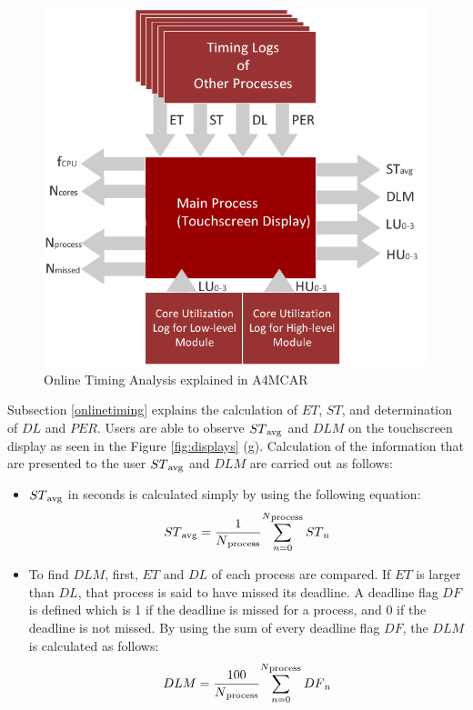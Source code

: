 \begin{figure}[!ht]
	\centering
	\includegraphics[scale=0.4]{content/images/a4mcartiming.png}
	\caption{Online Timing Analysis explained in A4MCAR}
	\label{fig:a4mcartiming}
\end{figure}

Subsection \ref{onlinetiming} explains the calculation of ${ET}$, ${ST}$, and determination of ${DL}$ and ${PER}$. Users are able to observe ${ST\textsubscript{avg}}$ and ${DLM}$ on the touchscreen display as seen in the Figure \ref{fig:displays} (g). Calculation of the information that are presented to the user ${ST\textsubscript{avg}}$ and ${DLM}$ are carried out as follows:

\begin{itemize}
	\item ${ST\textsubscript{avg}}$ in seconds is calculated simply by using the following equation:
	\begin{equation}
	ST\textsubscript{avg} =  {\frac{1}{N\textsubscript{process}}} {\sum_{n=0}^{N\textsubscript{process}} ST\textsubscript{n}} 
	\end{equation}
	\item To find ${DLM}$, first, ${ET}$ and ${DL}$ of each process are compared. If ${ET}$ is larger than ${DL}$, that process is said to have missed its deadline. A deadline flag ${DF}$ is defined which is 1 if the deadline is missed for a process, and 0 if the deadline is not missed. By using the sum of every deadline flag ${DF}$, the ${DLM}$ is calculated as follows:
	\begin{equation}
	DLM =  {\frac{100}{N\textsubscript{process}}} {\sum_{n=0}^{N\textsubscript{process}} DF\textsubscript{n}} 
	\end{equation}
\end{itemize}
\newpage
